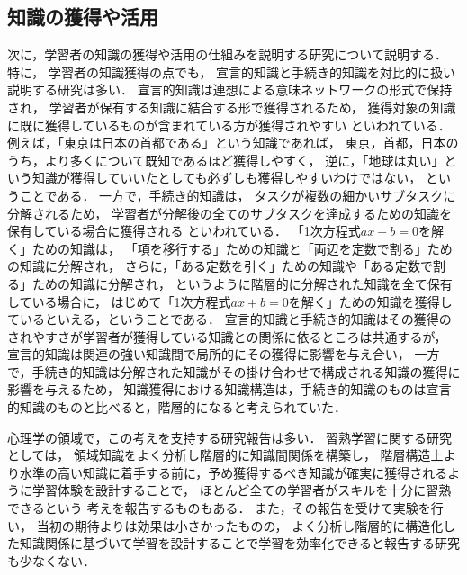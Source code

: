 \subsection{知識の獲得や活用}
次に，学習者の知識の獲得や活用の仕組みを説明する研究について説明する．
特に，
学習者の知識獲得の点でも，
宣言的知識と手続き的知識を対比的に扱い説明する研究は多い\cite{anderson1982acquisition, anderson1990adaptive}．
宣言的知識は連想による意味ネットワークの形式で保持され，
学習者が保有する知識に結合する形で獲得されるため，
獲得対象の知識に既に獲得しているものが含まれている方が獲得されやすい
といわれている．
例えば，「東京は日本の首都である」という知識であれば，
東京，首都，日本のうち，より多くについて既知であるほど獲得しやすく，
逆に，「地球は丸い」という知識が獲得していいたとしても必ずしも獲得しやすいわけではない，
ということである．
一方で，手続き的知識は，
タスクが複数の細かいサブタスクに分解されるため，
学習者が分解後の全てのサブタスクを達成するための知識を保有している場合に獲得される
といわれている．
「1次方程式$ax + b = 0$を解く」ための知識は，
「項を移行する」ための知識と「両辺を定数で割る」ための知識に分解され，
さらに，「ある定数を引く」ための知識や「ある定数で割る」ための知識に分解され，
というように階層的に分解された知識を全て保有している場合に，
はじめて「1次方程式$ax + b = 0$を解く」ための知識を獲得しているといえる，ということである．
宣言的知識と手続き的知識はその獲得のされやすさが学習者が獲得している知識との関係に依るところは共通するが，
宣言的知識は関連の強い知識間で局所的にその獲得に影響を与え合い，
一方で，手続き的知識は分解された知識がその掛け合わせで構成される知識の獲得に影響を与えるため，
知識獲得における知識構造は，手続き的知識のものは宣言的知識のものと比べると，階層的になると考えられていた．


心理学の領域で，この考えを支持する研究報告は多い．
習熟学習に関する研究としては，
領域知識をよく分析し階層的に知識間関係を構築し，
階層構造上より水準の高い知識に着手する前に，予め獲得するべき知識が確実に獲得されるように学習体験を設計することで，
ほとんど全ての学習者がスキルを十分に習熟できるという
考えを報告するもの\cite{keller1968good, bloom1968learning}もある．
また，その報告を受けて実験を行い，
当初の期待よりは効果は小さかったものの，
よく分析し階層的に構造化した知識関係に基づいて学習を設計することで学習を効率化できると報告する研究も少なくない\cite{block1971mastery, cohen1979learning, resnick1977assuming}．

